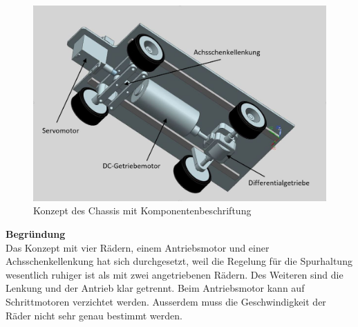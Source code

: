 \begin{figure}[H]%
\centering
\includegraphics[width=1\textwidth]{03_Loesungskonzept/pictures/Chassis_1.JPG}
\caption{Konzept des Chassis mit Komponentenbeschriftung}
\label{fig:activityRoute}
\end{figure}\flushleft
\textbf{Begründung}\\[0.2cm]
Das Konzept mit vier Rädern, einem Antriebsmotor und einer Achsschenkellenkung hat sich durchgesetzt, weil die Regelung für die Spurhaltung wesentlich ruhiger ist als mit zwei angetriebenen Rädern. Des Weiteren sind die Lenkung und der Antrieb klar getrennt. Beim Antriebsmotor kann auf Schrittmotoren verzichtet werden. Ausserdem muss die Geschwindigkeit der Räder nicht sehr genau bestimmt werden.